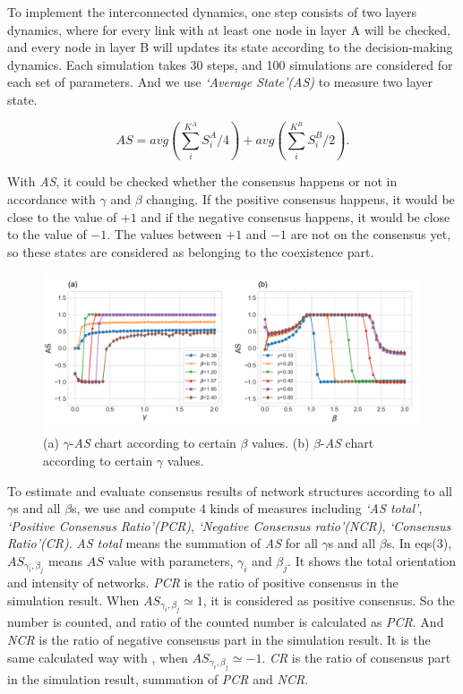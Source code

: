 \documentclass[english]{cccconf}
\begin{document}
To implement the interconnected dynamics, one step consists of two layers dynamics, where for every link with at least one node in layer A will be checked, and every node in layer B will updates its state according to the decision-making dynamics. Each simulation takes 30 steps, and 100 simulations are considered  for each set of parameters. And we use \textit{`Average State'(AS)} to measure two layer state.

\begin{equation}
AS = avg\left( {\sum\limits_i^{{K^A}} {S_i^A/4} } \right) + avg\left( {\sum\limits_i^{{K^B}} {S_i^B/2} } \right).
\end{equation}

With \textit{AS}, it could be checked whether the consensus happens or not in accordance with $\gamma$ and $\beta$ changing.  If the positive consensus happens, it would be close to the value of $+1$ and if the negative consensus happens, it would be close to the value of $-1$. The values between $+1$ and $-1$ are not on the consensus yet, so these states are considered as belonging to the coexistence part.

\begin{figure}[!htb]
	\centering
	\includegraphics[width=\hsize]{FIG2.png}
	\caption{(a) $\gamma$-\textit{AS} chart according to certain $\beta$ values. (b) $\beta$-\textit{AS} chart according to certain $\gamma$ values.}
	\label{Fig2}
\end{figure}

To estimate and evaluate consensus results of network structures according to all $\gamma$s and all $\beta$s, we use and compute $4$ kinds of measures including \textit{`AS total'}, \textit{`Positive Consensus Ratio'(PCR)}, \textit{`Negative Consensus ratio'(NCR)}, \textit{`Consensus Ratio'(CR)}. \textit{AS total} means the summation of \textit{AS} for all $\gamma$s and all $\beta$s. In eqs(3), ${A{S_{{\gamma _i},{\beta _j}}}}$ means $AS$ value with parameters, $\gamma_i$ and $\beta_j$. It shows the total orientation and intensity of networks. \textit{PCR} is the ratio of positive consensus in the simulation result. When ${A{S_{{\gamma _i},{\beta _j}}} \simeq  1}$, it is considered as positive consensus. So the number is counted, and ratio of the counted number is calculated as \textit{PCR}. And \textit{NCR} is the ratio of negative consensus part in the simulation result. It is the same calculated way with , when ${A{S_{{\gamma _i},{\beta _j}}} \simeq  -1}$. \textit{CR} is the ratio of consensus part in the simulation result, summation of \textit{PCR} and \textit{NCR}.
\end{document}
